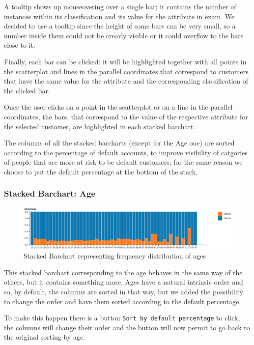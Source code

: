 \documentclass[journal]{vgtc}                %
\begin{document}
A tooltip shows up mouseovering over a single bar; it contains the number of instances within its classification and its value for the attribute in exam. We decided to use a tooltip since the height of some bars
can be very small, so a number inside them could not be crearly visible or it could overflow to the bars close to it.

Finally, each bar can be clicked: it will be highlighted together with all points in the scatterplot and lines in the parallel coordinates that correspond to customers
that have the same value for the attribute and the corresponding classification of the clicked bar.

Once the user clicks on a point in the scatterplot or on a line in the parallel coordinates, the bars, that correspond to the value of the respective attribute for the selected customer, are highlighted in each stacked barchart.

The columns of all the stacked barcharts (except for the Age one) are sorted according to the percentage of default accounts, to improve visibility of catgories of people that are more at risk to be default customers; for the same
reason we choose to put the default percentage at the bottom of the stack.

\subsubsection{Stacked Barchart: Age}
\begin{figure}[h]
  \centering
  \includegraphics[scale=0.15]{age}
  \caption{Stacked Barchart representing frequency distribution of ages}
  \label{age}
\end{figure}

This stacked barchart corresponding to the age behaves in the same way of the others, but it contains something more.
Ages have a natural intrinsic order and so, by default, the columns are sorted in that way, but we added the possibility
to change the order and have them sorted according to the default percentage.

To make this happen there is a button \texttt{Sort by default percentage} to click, the columns will change their order and
the button will now permit to go back to the original sorting by age.
\end{document}
